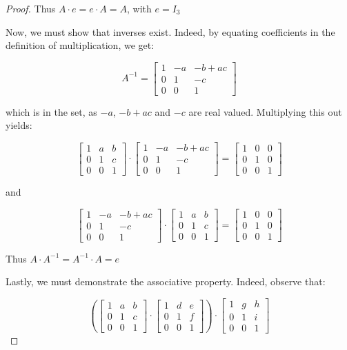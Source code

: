 \documentclass{article}
\begin{document}
\begin{proof}
Thus $A \cdot e = e \cdot A = A$, with $e = I_3$

Now, we must show that inverses exist. Indeed, by equating coefficients in the definition of multiplication, we get:

\[
A^{-1} = 
\begin{bmatrix}
    1 & -a & -b+ac \\
    0 & 1 & -c \\
    0 & 0 & 1
    \end{bmatrix}
\]

which is in the set, as $-a$, $-b+ac$ and $-c$ are real valued. Multiplying this out yields:

\[
\begin{bmatrix}
    1 & a & b \\
    0 & 1 & c \\
    0 & 0 & 1
    \end{bmatrix}
    \cdot
    \begin{bmatrix}
    1 & -a & -b+ac \\
    0 & 1 & -c \\
    0 & 0 & 1
    \end{bmatrix}
    =
    \begin{bmatrix}
    1 & 0 & 0 \\
    0 & 1 & 0 \\
    0 & 0 & 1
    \end{bmatrix}
\]

and

\[
\begin{bmatrix}
    1 & -a & -b+ac \\
    0 & 1 & -c \\
    0 & 0 & 1
    \end{bmatrix}
    \cdot
    \begin{bmatrix}
    1 & a & b \\
    0 & 1 & c \\
    0 & 0 & 1
    \end{bmatrix}
    =
    \begin{bmatrix}
    1 & 0 & 0 \\
    0 & 1 & 0 \\
    0 & 0 & 1
    \end{bmatrix}
\]

Thus $A \cdot A^{-1} = A^{-1} \cdot A = e$

Lastly, we must demonstrate the associative property. Indeed, observe that:

\[
\left(\begin{bmatrix}
    1 & a & b \\
    0 & 1 & c \\
    0 & 0 & 1
    \end{bmatrix}
    \cdot
    \begin{bmatrix}
    1 & d & e \\
    0 & 1 & f \\
    0 & 0 & 1
    \end{bmatrix}\right)
    \cdot
    \begin{bmatrix}
    1 & g & h \\
    0 & 1 & i \\
    0 & 0 & 1
    \end{bmatrix}
\]


\end{proof}
\end{document}
